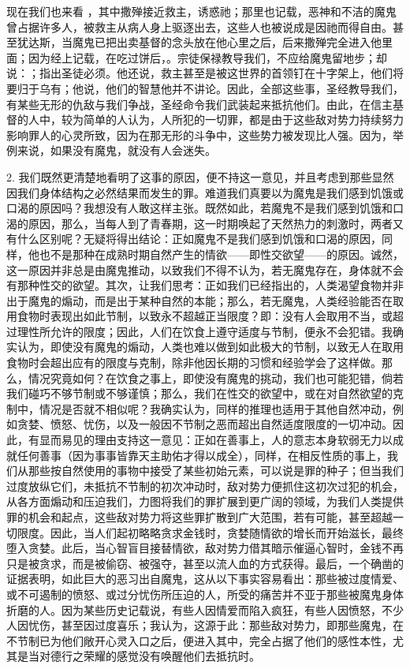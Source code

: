 现在我们也来看 ，其中撒殚接近救主，诱惑祂；那里也记载，恶神和不洁的魔鬼曾占据许多人，被救主从病人身上驱逐出去，这些人也被说成是因祂而得自由。甚至犹达斯，当魔鬼已把出卖基督的念头放在他心里之后，后来撒殚完全进入他里面；因为经上记载，在吃过饼后，。宗徒保禄教导我们，不应给魔鬼留地步；却说：；指出圣徒必须。他还说，救主甚至是被这世界的首领钉在十字架上，他们将要归于乌有；他说，他们的智慧他并不讲论。因此，全部这些事，圣经教导我们，有某些无形的仇敌与我们争战，圣经命令我们武装起来抵抗他们。由此，在信主基督的人中，较为简单的人认为，人所犯的一切罪，都是由于这些敌对势力持续努力影响罪人的心灵所致，因为在那无形的斗争中，这些势力被发现比人强。因为，举例来说，如果没有魔鬼，就没有人会迷失。\par

2. 我们既然更清楚地看明了这事的原因，便不持这一意见，并且考虑到那些显然因我们身体结构之必然结果而发生的罪。难道我们真要以为魔鬼是我们感到饥饿或口渴的原因吗？我想没有人敢这样主张。既然如此，若魔鬼不是我们感到饥饿和口渴的原因，那么，当每人到了青春期，这一时期唤起了天然热力的刺激时，两者又有什么区别呢？无疑将得出结论：正如魔鬼不是我们感到饥饿和口渴的原因，同样，他也不是那种在成熟时期自然产生的情欲——即性交欲望——的原因。诚然，这一原因并非总是由魔鬼推动，以致我们不得不认为，若无魔鬼存在，身体就不会有那种性交的欲望。其次，让我们思考：正如我们已经指出的，人类渴望食物并非出于魔鬼的煽动，而是出于某种自然的本能；那么，若无魔鬼，人类经验能否在取用食物时表现出如此节制，以致永不超越正当限度？即：没有人会取用不当，或超过理性所允许的限度；因此，人们在饮食上遵守适度与节制，便永不会犯错。我确实认为，即使没有魔鬼的煽动，人类也难以做到如此极大的节制，以致无人在取用食物时会超出应有的限度与克制，除非他因长期的习惯和经验学会了这样做。那么，情况究竟如何？在饮食之事上，即使没有魔鬼的挑动，我们也可能犯错，倘若我们碰巧不够节制或不够谨慎；那么，我们在性交的欲望中，或在对自然欲望的克制中，情况是否就不相似呢？我确实认为，同样的推理也适用于其他自然冲动，例如贪婪、愤怒、忧伤，以及一般因不节制之恶而超出自然适度限度的一切冲动。因此，有显而易见的理由支持这一意见：正如在善事上，人的意志本身软弱无力以成就任何善事（因为事事皆靠天主助佑才得以成全），同样，在相反性质的事上，我们从那些按自然使用的事物中接受了某些初始元素，可以说是罪的种子；但当我们过度放纵它们，未抵抗不节制的初次冲动时，敌对势力便抓住这初次过犯的机会，从各方面煽动和压迫我们，力图将我们的罪扩展到更广阔的领域，为我们人类提供罪的机会和起点，这些敌对势力将这些罪扩散到广大范围，若有可能，甚至超越一切限度。因此，当人们起初略略贪求金钱时，贪婪随情欲的增长而开始滋长，最终堕入贪婪。此后，当心智盲目接替情欲，敌对势力借其暗示催逼心智时，金钱不再只是被贪求，而是被偷窃、被强夺，甚至以流人血的方式获得。最后，一个确凿的证据表明，如此巨大的恶习出自魔鬼，这从以下事实容易看出：那些被过度情爱、或不可遏制的愤怒、或过分忧伤所压迫的人，所受的痛苦并不亚于那些被魔鬼身体折磨的人。因为某些历史记载说，有些人因情爱而陷入疯狂，有些人因愤怒，不少人因忧伤，甚至因过度喜乐；我认为，这源于此：那些敌对势力，即那些魔鬼，在不节制已为他们敞开心灵入口之后，便进入其中，完全占据了他们的感性本性，尤其是当对德行之荣耀的感觉没有唤醒他们去抵抗时。\par

